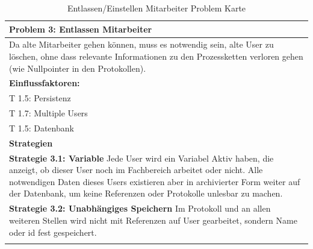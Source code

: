 \documentclass[enabledeprecatedfontcommands,fontsize=12pt,paper=a4,twoside]{scrartcl}
\begin{document}
\begin{table}[H]
    \centering
    \begin{tabular}{|p{15cm}|}
    \hline
          \textbf{Problem 3:} Entlassen Mitarbeiter \\ \hline 
          Da alte Mitarbeiter gehen können, muss es notwendig sein, alte User zu löschen, ohne dass relevante Informationen zu den Prozessketten verloren gehen (wie Nullpointer in den Protokollen).
          \\ \hline
          \textbf{Einflussfaktoren: } \\
          T 1.5: Persistenz \\
          T 1.7: Multiple Users\\
          T 1.5: Datenbank \\
          \hline
          \textbf{Strategien} \\ \hline
          \textbf{Strategie 3.1: Variable} Jede User  wird ein Variabel Aktiv haben, die anzeigt, ob dieser User noch im Fachbereich arbeitet oder nicht. Alle notwendigen Daten dieses Users existieren aber in archivierter Form weiter auf der Datenbank, um keine Referenzen oder Protokolle unlesbar zu machen. \\
	\textbf{Strategie 3.2: Unabhängiges Speichern} Im Protokoll und an allen weiteren Stellen wird nicht mit Referenzen auf User gearbeitet, sondern Name oder id fest gespeichert. \\
          \\ \hline

    \end{tabular}


    \caption{Entlassen/Einstellen Mitarbeiter Problem Karte}

    \label{tab:ProblemKarte3}

\end{table}
\end{document}
